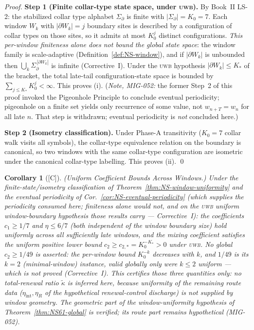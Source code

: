 \documentclass[12pt,oneside]{amsbook}
\theoremstyle{plain}
\newtheorem{corollary}[theorem]{Corollary}
\theoremstyle{definition}
\theoremstyle{remark}
\newcommand{\status}[1]{\textup{[#1]}}
\begin{document}
\begin{proof}
\textbf{Step 1 (Finite collar-type state space, under
\textsc{uwb}).}
By Book~II LS-2: the stabilized collar type alphabet
$\Sigma_\partial$ is finite with $|\Sigma_\partial| = K_0 = 7$.
Each window $W_k$ with $|\partial W_k| = j$ boundary sites is
described by a configuration of collar types on those sites, so it
admits at most $K_0^{j}$ distinct configurations. \emph{This
per-window finiteness alone does not bound the global state space}:
the window family is scale-adaptive
(Definition~\ref{def:NS-window}), and if $|\partial W_k|$ is
unbounded then $\bigcup_k \Sigma_\partial^{\,|\partial W_k|}$ is
infinite (Corrective~I). Under the \textsc{uwb} hypothesis
$|\partial W_k| \leq K_*$ of the bracket, the total late-tail
configuration-state space is bounded by
$\sum_{j \leq K_*} K_0^{j} < \infty$. This proves (i). (\emph{Note, MIG-052:} the former Step~2 of this
proof invoked the Pigeonhole Principle to conclude eventual
periodicity; pigeonhole on a finite set yields only recurrence of
some value, not $w_{n+T} = w_n$ for all late $n$. That step is
withdrawn; eventual periodicity is \emph{not} concluded here.)

\textbf{Step 2 (Isometry classification).}
Under Phase-A transitivity ($K_0 = 7$ collar walk visits all
symbols), the collar-type equivalence relation on the boundary is
canonical, so two windows with the same collar-type configuration
are isometric under the canonical collar-type labelling. This
proves (ii). \qed
\end{proof}

\begin{corollary}[\status{C}]\label{cor:window-uniform-coeffs}
\textup{(Uniform Coefficient Bounds Across Windows.)}
Under the finite-state/isometry classification of
Theorem~\ref{thm:NS-window-uniformity} \emph{and the eventual
periodicity of Cor.~\ref{cor:NS-eventual-periodicity}} (which
supplies the periodicity consumed here; finiteness alone would
not, and on the \textsc{uwb} uniform window-boundary hypothesis
those results carry --- Corrective~I): the coefficients
$c_1 \geq 1/7$ and $\eta \leq 6/7$ (both independent of the
window boundary size) hold uniformly across all sufficiently late
windows, and the mixing coefficient satisfies the uniform positive
lower bound $c_2 \geq c_{2,*} = K_0^{-K_*} > 0$ under
\textsc{uwb}. \emph{No global $c_2 \geq 1/49$ is asserted}: the
per-window bound $K_0^{-k}$ decreases with $k$, and $1/49$ is its
$k = 2$ (minimal-window) instance, valid globally only were
$k \leq 2$ uniform --- which is not proved (Corrective~I). \emph{This certifies those
three quantities only}: no total-renewal ratio
$\widetilde\kappa$ is inferred here, because uniformity of the
remaining route data ($\eta_{\mathrm{int}}, \eta_R$ of the
hypothetical renewal-control discharge) is not supplied by window
geometry. The \emph{geometric} part of the window-uniformity
hypothesis of Theorem~\ref{thm:NS61-global} is verified; its
route part remains hypothetical (MIG-052).
\end{corollary}
\end{document}
